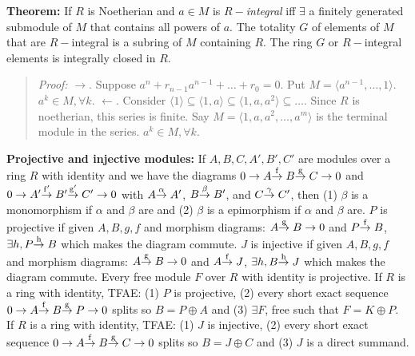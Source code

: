 {\bf Theorem:} 
If $R$ is Noetherian and $a \in M$ is $R-$\emph{integral} iff $\exists$ a finitely
generated submodule of $M$ that contains all powers of $a$.  The totality
$G$ of elements of $M$ that are $R-$integral is a subring of $M$ containing
$R$.  The ring $G$ or $R-$integral elements is integrally closed in $R$.
\begin{quote}
\emph{Proof:} $\rightarrow$.  Suppose $a^n + r_{n-1} a^{n-1} + \ldots + r_0 = 0$.
Put $M= \langle a^{n-1}, \ldots, 1 \rangle$.  $a^k \in M, \forall k$.
$\leftarrow$. Consider 
$\langle 1 \rangle \subseteq \langle 1, a \rangle \subseteq
\langle 1, a, a^2 \rangle \subseteq \ldots$.  Since $R$ is noetherian, this series
is finite.  Say $M = \langle 1, a, a^2, \ldots, a^m \rangle$ is the terminal module
in the series.  $a^k \in M, \forall k$.
\end{quote}
{\bf Projective and injective modules:}
If $A, B, C, A', B', C'$ are modules 
over a ring $R$ with identity and we have the diagrams
$0 \rightarrow A
{\buildrel\rm f\over \rightarrow} \; B {\buildrel\rm g\over \rightarrow} \; 
C \rightarrow 0$
and
$0 \rightarrow A'
{\buildrel\rm f'\over \rightarrow} \; B' {\buildrel\rm g'\over \rightarrow} \; 
C' \rightarrow 0$ with 
$A
{\buildrel\rm \alpha\over \rightarrow} \; 
A'$,
$B
{\buildrel\rm \beta\over \rightarrow} \; 
B'$, and
$C
{\buildrel\rm \gamma\over \rightarrow} \; 
C'$, then (1) $\beta$ is a monomorphism if $\alpha$ and $\beta$ are and (2)
$\beta$ is a epimorphism if $\alpha$ and $\beta$ are.
$P$ is projective if given $A, B, g, f$ and morphism diagrams:
$A {\buildrel\rm g\over \rightarrow} \; B \rightarrow 0$ and
$P {\buildrel\rm f\over \rightarrow} \; B$, $\exists h,
P {\buildrel\rm h\over \rightarrow} \; B$ which makes the diagram commute.
$J$ is injective if given $A, B, g, f$ and morphism diagrams:
$A {\buildrel\rm g\over \rightarrow} \; B \rightarrow 0$ and
$A {\buildrel\rm f\over \rightarrow} \; J$, $\exists h,
B {\buildrel\rm h\over \rightarrow} \; J$ which makes the diagram commute.
Every free module $F$ over $R$ with identity is projective.  
If $R$ is a ring
with identity, TFAE: (1) $P$ is projective, (2) every short exact sequence
$0 \rightarrow A
{\buildrel\rm f\over \rightarrow} \; B {\buildrel\rm g\over \rightarrow} \; 
P \rightarrow 0$ splits so $B= P \oplus A$ and (3) $\exists F$, free such that
$F=K \oplus P$.
If $R$ is a ring
with identity, TFAE: (1) $J$ is injective, (2) every short exact sequence
$0 \rightarrow A
{\buildrel\rm f\over \rightarrow} \; B {\buildrel\rm g\over \rightarrow} \; 
C \rightarrow 0$ splits so $B= J \oplus C$ and (3) $J$ is a direct summand.
